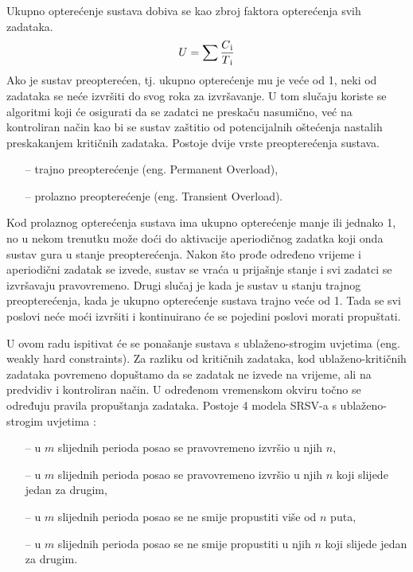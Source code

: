 \documentclass[../zavrsni.tex]{subfiles}
\begin{document}
Ukupno opterećenje sustava dobiva se kao zbroj faktora opterećenja svih zadataka. 
\begin{equation*}
    U = \sum\frac{C\textsubscript{i}}{T\textsubscript{i}}
\end{equation*}
Ako je sustav preopterećen, tj. ukupno opterećenje mu 
je veće od 1, neki od zadataka se neće izvršiti do svog roka za izvršavanje. U tom slučaju koriste se algoritmi koji će osigurati 
da se zadatci ne preskaču nasumično, već na kontroliran način kao bi se sustav zaštitio od potencijalnih oštećenja nastalih preskakanjem 
kritičnih zadataka. Postoje dvije vrste preopterećenja sustava.
\begin{itemize}
    \item[--] trajno preopterećenje (eng. Permanent Overload),
    \item[--] prolazno preopterećenje (eng. Transient Overload).
\end{itemize}
Kod prolaznog opterećenja sustava ima ukupno opterećenje manje ili jednako 1, no u nekom trenutku može doći do aktivacije aperiodičnog zadatka 
koji onda sustav gura u stanje preopterećenja. Nakon što prođe određeno vrijeme i aperiodični zadatak se izvede, sustav se vraća u prijašnje
stanje i svi zadatci se izvršavaju pravovremeno. Drugi slučaj je kada je sustav u stanju trajnog preopterećenja, kada je ukupno 
opterećenje sustava trajno veće od 1. Tada se svi poslovi neće moći izvršiti i kontinuirano će se pojedini poslovi morati propuštati. 


U ovom radu ispitivat će se ponašanje sustava s ublaženo-strogim uvjetima (eng. weakly hard constraints). Za razliku od 
kritičnih zadataka, kod ublaženo-kritičnih zadataka povremeno dopuštamo da se zadatak ne izvede na vrijeme, ali na predvidiv i 
kontroliran način. U određenom vremenskom okviru točno se određuju pravila propuštanja zadataka. Postoje 4 modela SRSV-a s ublaženo-strogim uvjetima :
\begin{itemize}
    \item[--] u $m$ slijednih perioda posao se pravovremeno izvršio u njih $n$,
    \item[--] u $m$ slijednih perioda posao se pravovremeno izvršio u njih $n$ koji slijede jedan za drugim,
    \item[--] u $m$ slijednih perioda posao se ne smije propustiti više od $n$ puta,
    \item[--] u $m$ slijednih perioda posao se ne smije propustiti u njih $n$ koji slijede jedan za drugim.
\end{itemize}
\end{document}

